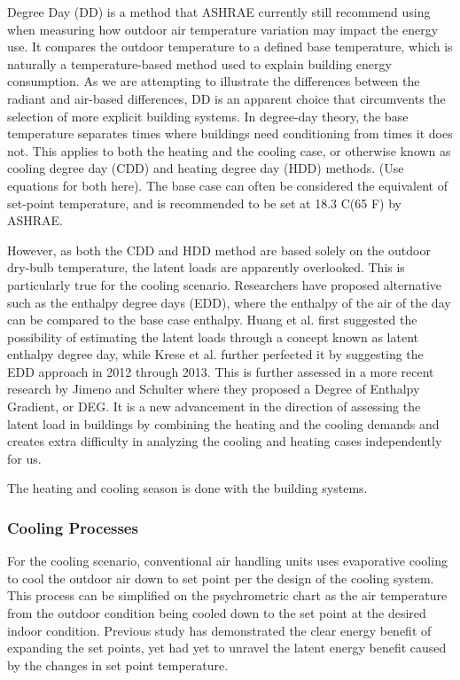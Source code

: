 Degree Day (DD) is a method that ASHRAE currently still recommend using when measuring how outdoor air temperature variation may impact the energy use. It compares the outdoor temperature to a defined base temperature, which is naturally a temperature-based method used to explain building energy consumption. As we are attempting to illustrate the differences between the radiant and air-based differences, DD is an apparent choice that circumvents the selection of more explicit building systems. In degree-day theory, the base temperature separates times where buildings need conditioning from times it does not. This applies to both the heating and the cooling case, or otherwise known as cooling degree day (CDD) and heating degree day (HDD) methods. (Use equations for both here).  The base case can often be considered the equivalent of set-point temperature, and is recommended to be set at 18.3 C(65 F) by ASHRAE.

However, as both the CDD and HDD method are based solely on the outdoor dry-bulb temperature, the latent loads are apparently overlooked. This is particularly true for the cooling scenario. Researchers have proposed alternative such as the enthalpy degree days (EDD), where the enthalpy of the air of the day can be compared to the base case enthalpy. Huang et al. first suggested the possibility of estimating the latent loads through a concept known as latent enthalpy degree day, while Krese et al. further perfected it by suggesting the EDD approach in 2012 through 2013. This is further assessed in a more recent research by Jimeno and Schulter where they proposed a Degree of Enthalpy Gradient, or DEG. It is a new advancement in the direction of assessing the latent load in buildings by combining the heating and the cooling demands and creates extra difficulty in analyzing the cooling and heating cases independently for us. 

The heating and cooling season is done with the building systems. 

\subsubsection{Cooling Processes}
    For the cooling scenario, conventional air handling units uses evaporative cooling to cool the outdoor air down to set point per the design of the cooling system. This process can be simplified on the psychrometric chart as the air temperature from the outdoor condition being cooled down to the set point at the desired indoor condition. Previous study has demonstrated the clear energy benefit of expanding the set points, yet had yet to unravel the latent energy benefit caused by the changes in set point temperature.

